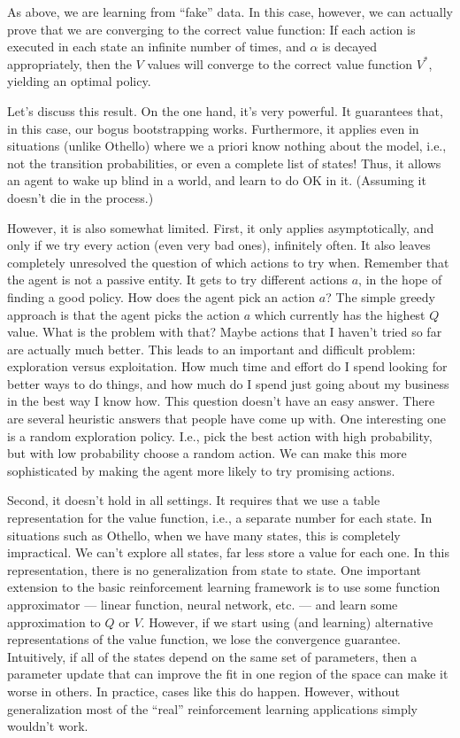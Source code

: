 As above, we are learning from ``fake'' data.  In this case, however, we can
actually prove that we are converging to the correct value function:
\thm
If each action is executed in each state an infinite number of  times,
and $\alpha$ is decayed appropriately, then the $V$ values will
converge to the correct value function $V^*$, yielding an optimal policy.
\ethm

Let's discuss this result.  On the one hand, it's very powerful.  It
guarantees that, in this case, our bogus bootstrapping works.  Furthermore,
it applies even in situations (unlike Othello) where we a priori know nothing
about the model, i.e., not the transition probabilities, or even a complete
list of states!  Thus, it allows an agent to wake up blind in a world, and
learn to do OK in it.  (Assuming it doesn't die in the process.)

However, it is also somewhat limited.  First, it only applies asymptotically,
and only if we try every action (even very bad ones), infinitely often.
It also leaves completely unresolved the question of which actions to try
when.  Remember that the
agent is not a passive entity.  It gets to try different actions $a$, in the
hope of finding a good policy.  How does the agent pick an action $a$?
The simple greedy approach is that the agent picks the action $a$ which
currently has the highest $Q$ value.  What is the problem with that?  Maybe
actions that I haven't tried so far are actually much better.  This leads to
an important and difficult problem: exploration versus exploitation.  How
much time and effort do I spend looking for better ways to do things, and how 
much do I spend just going about my business in the best way I know how.
This question doesn't have an easy answer.  There are several heuristic
answers that people have come up with.  One interesting one is a random
exploration policy.  I.e., pick the best action with high probability, but
with low probability choose a random action.  We can make this more
sophisticated by making the agent more likely to try promising actions.  

Second, it doesn't hold in all settings.  It requires that we use a table
representation for the value function, i.e., a separate number for each
state.  In situations such as Othello, when we have many states, this is
completely impractical.  We can't explore all states, far less store a value
for each one.  In this representation, there is no generalization from state
to state.  One important extension to the basic reinforcement learning
framework is to use some function approximator --- linear function, neural
network, etc. --- and learn some approximation to $Q$ or $V$.  However,
if we start using (and learning) alternative representations of the value
function, we lose the convergence guarantee.  Intuitively, if all of the
states depend on the same set of parameters, then a parameter update
that can improve the fit in one region of the space can make it worse
in others.  In practice, cases like this do happen. However, without
generalization most of the ``real'' reinforcement learning applications
simply wouldn't work. 

